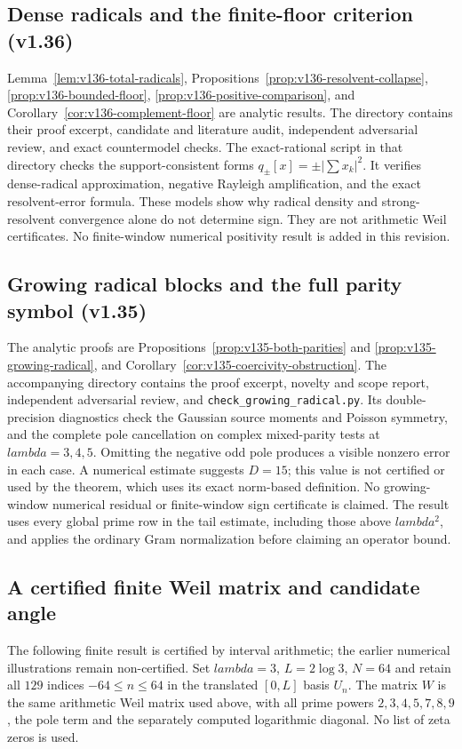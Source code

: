 \documentclass[11pt]{article}
\def\lambda{lambda}%
\theoremstyle{remark}
\begin{document}
\subsection{Dense radicals and the finite-floor criterion (v1.36)}
Lemma~\ref{lem:v136-total-radicals},
Propositions~\ref{prop:v136-resolvent-collapse},
\ref{prop:v136-bounded-floor}, \ref{prop:v136-positive-comparison}, and
Corollary~\ref{cor:v136-complement-floor} are analytic results. The directory
 contains their proof excerpt, candidate and
literature audit, independent adversarial review, and exact countermodel
checks. The exact-rational script in that directory checks the support-consistent forms
$q_\pm[x]=\pm|\sum x_k|^2$. It verifies dense-radical approximation,
negative Rayleigh amplification, and the exact resolvent-error formula.
These models show why radical density and strong-resolvent convergence
alone do not determine sign. They are not arithmetic Weil certificates.
No finite-window numerical positivity result is added in this revision.

\subsection{Growing radical blocks and the full parity symbol (v1.35)}
The analytic proofs are Propositions~\ref{prop:v135-both-parities} and
\ref{prop:v135-growing-radical}, and
Corollary~\ref{cor:v135-coercivity-obstruction}.  The accompanying directory
 contains the proof excerpt, novelty and
scope report, independent adversarial review, and
\texttt{check\_growing\_radical.py}.  Its double-precision diagnostics check
the Gaussian source moments and Poisson symmetry, and the complete pole
cancellation on complex mixed-parity tests at $\lambda=3,4,5$.
Omitting the negative odd pole produces a visible nonzero error in each
case.  A numerical estimate suggests $D=15$; this value is not certified
or used by the theorem, which uses its exact norm-based definition.
No growing-window numerical residual or finite-window sign certificate is
claimed.  The result uses every global prime row in the tail estimate,
including those above $\lambda^2$, and applies the ordinary Gram
normalization before claiming an operator bound.


\subsection{A certified finite Weil matrix and candidate angle}
\label{app:v112-certificate}
The following finite result is certified by interval arithmetic; the
earlier numerical illustrations remain non-certified. Set
$\lambda=3$, $L=2\log3$, $N=64$ and retain all $129$ indices
$-64\le n\le64$ in the translated $[0,L]$ basis $U_n$.
The matrix $W$ is the same arithmetic Weil matrix used above, with all
prime powers $2,3,4,5,7,8,9$, the pole term and the separately computed
logarithmic diagonal. No list of zeta zeros is used.
\end{document}
